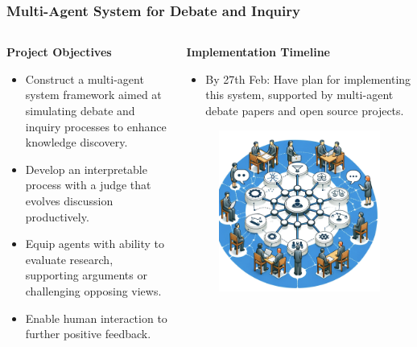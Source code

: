 \documentclass{beamer}
\begin{document}
\begin{frame}
    \frametitle{Multi-Agent System for Debate and Inquiry}
    
    \begin{columns}[T] %
        \begin{column}{.5\textwidth}
            \textbf{Project Objectives}
            \begin{itemize}
                \item Construct a multi-agent system framework aimed at simulating debate and inquiry processes to enhance knowledge discovery.
                \item Develop an interpretable process with a judge that evolves discussion productively.
                \item Equip agents with ability to evaluate research, supporting arguments or challenging opposing views.
                \item Enable human interaction to further positive feedback.
            \end{itemize}
        \end{column}
        \begin{column}{.5\textwidth}
            \textbf{Implementation Timeline}
            \begin{itemize}
                \item By 27th Feb: Have plan for implementing this system, supported by multi-agent debate papers and open source projects.
            \end{itemize}
            \vspace{1em} %
            \begin{figure}
                \centering
                \includegraphics[width=\textwidth]{chatlab.png}
                \caption{}
            \end{figure}
        \end{column}
    \end{columns}
    

\end{frame}
\end{document}
